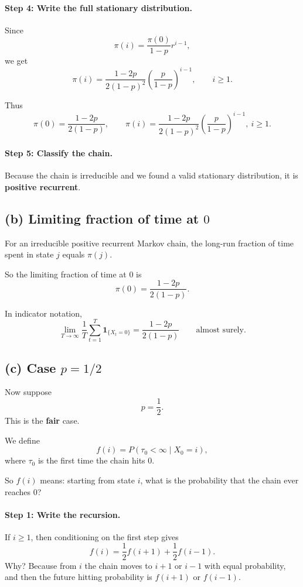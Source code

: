 \documentclass[11pt]{article}
\begin{document}
\paragraph{Step 4: Write the full stationary distribution.}

Since
\[
\pi(i)=\frac{\pi(0)}{1-p}r^{i-1},
\]
we get
\[
\pi(i)=\frac{1-2p}{2(1-p)^2}\left(\frac{p}{1-p}\right)^{i-1},
\qquad i\ge1.
\]

Thus
\[
\boxed{
\pi(0)=\frac{1-2p}{2(1-p)},\qquad
\pi(i)=\frac{1-2p}{2(1-p)^2}\left(\frac{p}{1-p}\right)^{i-1},\ i\ge1.
}
\]

\paragraph{Step 5: Classify the chain.}

Because the chain is irreducible and we found a valid stationary distribution, it is \textbf{positive recurrent}.

\subsection*{(b) Limiting fraction of time at $0$}

For an irreducible positive recurrent Markov chain, the long-run fraction of time spent in state $j$ equals $\pi(j)$.

So the limiting fraction of time at $0$ is
\[
\boxed{
\pi(0)=\frac{1-2p}{2(1-p)}.
}
\]

In indicator notation,
\[
\lim_{T\to\infty}\frac1T\sum_{t=1}^T \mathbf 1_{\{X_t=0\}}
=
\frac{1-2p}{2(1-p)}
\qquad \text{almost surely.}
\]

\subsection*{(c) Case $p=1/2$}

Now suppose
\[
p=\frac12.
\]
This is the \textbf{fair} case.

We define
\[
f(i)=P(\tau_0<\infty \mid X_0=i),
\]
where $\tau_0$ is the first time the chain hits $0$.

So $f(i)$ means: starting from state $i$, what is the probability that the chain ever reaches $0$?

\paragraph{Step 1: Write the recursion.}

If $i\ge1$, then conditioning on the first step gives
\[
f(i)=\frac12 f(i+1)+\frac12 f(i-1).
\]
Why? Because from $i$ the chain moves to $i+1$ or $i-1$ with equal probability, and then the future hitting probability is $f(i+1)$ or $f(i-1)$.
\end{document}
